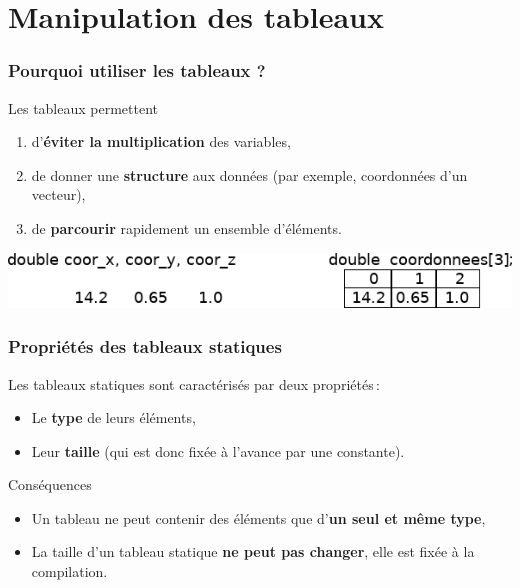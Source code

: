 \section{Manipulation des tableaux}

\begin{frame}
	\frametitle{Pourquoi utiliser les tableaux ?}
	\begin{block}{Les tableaux permettent}
		\begin{enumerate}
		\item d'\textbf{éviter la multiplication} des variables,
		\item de donner une \textbf{structure} aux données (par exemple, coordonnées d'un vecteur),
		\item de \textbf{parcourir} rapidement un ensemble d'éléments.
		\end{enumerate}
	\end{block}
    
    \includegraphics[width=\textwidth]{images/tableau}
\end{frame}

\begin{frame}[fragile]
	\frametitle{Propriétés des tableaux statiques}
	Les tableaux statiques sont caractérisés par deux propriétés\,:
	\begin{itemize}
		\item Le \textbf{type} de leurs éléments,
		\item Leur \textbf{taille} (qui est donc fixée à l'avance par une constante).
	\end{itemize}
    
    \begin{alertblock}{Conséquences}
    \begin{itemize}
    	\item Un tableau ne peut contenir des éléments que d'\textbf{un seul et même type},
      \item La taille d'un tableau statique \textbf{ne peut pas changer}, elle est fixée à la compilation.
    \end{itemize}
    \end{alertblock}
\end{frame}

